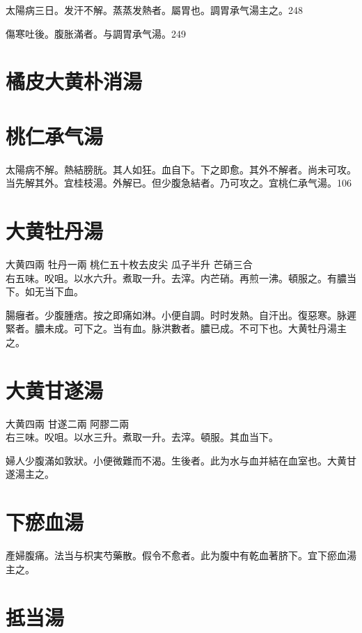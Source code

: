 太陽病三日。发汗不解。蒸蒸发熱者。{\khaaitp 屬胃也。調胃}承气湯主之。248

傷寒吐後。腹胀滿者。与{\khaaitp 調胃}承气湯。249

\section{橘皮大黄朴消湯}

\section{桃仁承气湯}

太陽病不解。熱結膀胱。其人如狂。血自下。下之即愈。其外不解者。尚未可攻。当先解其外。{\khaaitp 宜桂枝湯。}外解已。{\khaaitp 但}少腹急結者。乃可攻之。宜桃仁承气湯。106

\section{大黄牡丹湯}

大黄{\scriptsize 四兩} 牡丹{\scriptsize 一兩} 桃仁{\scriptsize 五十枚去皮尖} 瓜子{\scriptsize 半升} 芒硝{\scriptsize 三合}\\
右五味。㕮咀。以水六升。煮取一升。去滓。内芒硝。再煎一沸。頓服之。有膿当下。如无当下血。

腸癰者。少腹腫痞。按之即痛如淋。小便自調。时时发熱。自汗出。復惡寒。脉遲緊者。膿未成。可下之。当有血。脉洪數者。膿已成。不可下也。大黄牡丹湯主之。

\section{大黄甘遂湯}

大黄{\scriptsize 四兩} 甘遂{\scriptsize 二兩} 阿膠{\scriptsize 二兩}\\
右三味。㕮咀。以水三升。煮取一升。去滓。頓服。其血当下。

婦人少腹滿如敦狀。小便微難而不渴。生後者。此为水与血并結在血室也。大黄甘遂湯主之。

\section{下瘀血湯}

產婦腹痛。法当与枳実芍藥散。假令不愈者。此为腹中有乾血著脐下。宜下瘀血湯主之。

\section{抵当湯}

